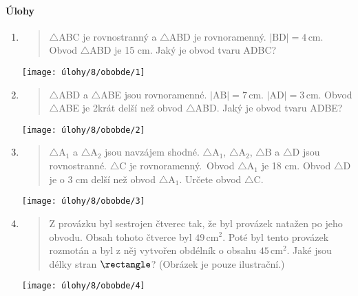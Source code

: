 \paragraph{Úlohy}
\begin{enumerate}
    \item
    \begin{minipage}[t]{\linewidth}
        \begin{quote}
            $\triangle$ABC je rovnostranný a $\triangle$ABD je rovnoramenný. $\lvert \text{BD} \rvert = 4\,\text{cm}$.
            Obvod $\triangle$ABD je 15 cm.
            Jaký je obvod tvaru ADBC?
        \end{quote}
        \centering
        \texttt{[image: úlohy/8/obobde/1]}

    \end{minipage}

    \item
    \begin{minipage}[t]{\linewidth}
        \begin{quote}
            $\triangle$ABD a $\triangle$ABE jsou rovnoramenné. $\lvert \text{AB} \rvert = 7\,\text{cm}$. $\lvert \text{AD} \rvert = 3\,\text{cm}$.
            Obvod $\triangle$ABE je 2krát delší než obvod $\triangle$ABD. Jaký je obvod tvaru ADBE?
        \end{quote}
        \centering
        \texttt{[image: úlohy/8/obobde/2]}

    \end{minipage}

    \item
    \begin{minipage}[t]{\linewidth}
        \begin{quote}
            $\triangle{\text{A}}_{1}$ a $\triangle{\text{A}}_{2}$ jsou navzájem shodné. $\triangle{\text{A}}_{1}$, $\triangle{\text{A}}_{2}$, $\triangle{\text{B}}$ a $\triangle{\text{D}}$ jsou rovnostranné. $\triangle{\text{C}}$ je rovnoramenný.\             Obvod $\triangle{\text{A}}_{1}$ je 18 cm.
            Obvod $\triangle$D je o 3 cm delší než obvod $\triangle{\text{A}}_{1}$.
            Určete obvod $\triangle$C.
        \end{quote}
        \centering
        \texttt{[image: úlohy/8/obobde/3]}

    \end{minipage}

    \item
    \begin{minipage}[t]{\linewidth}
        \begin{quote}
            Z provázku byl sestrojen čtverec tak, že byl provázek natažen po jeho obvodu.
            Obsah tohoto čtverce byl $49\,\text{cm}^{2}$.
            Poté byl tento provázek rozmotán a byl z něj vytvořen obdélník o obsahu $45\,\text{cm}^{2}$.
            Jaké jsou délky stran $\rectangle$?
            (Obrázek je pouze ilustrační.)
        \end{quote}
        \centering
        \texttt{[image: úlohy/8/obobde/4]}


\end{minipage}
\end{enumerate}
